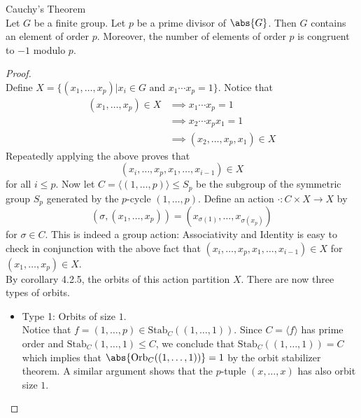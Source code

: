 \documentclass[a4paper]{article}
\begin{document}
\begin{thm}{Cauchy's Theorem}{}\\
Let $G$ be a finite group. Let $p$ be a prime divisor of $\abs{G}$. Then $G$ contains an element of order $p$. Moreover, the number of elements of order $p$ is congruent to $-1$ modulo $p$. 
\begin{proof}\\
Define $X=\{(x_1,\dots,x_p)|x_i\in G\text{ and }x_1\cdots x_p=1\}$. Notice that 
\begin{align*}
(x_1,\dots,x_p)\in X&\implies x_1\cdots x_p=1\\
&\implies x_2\cdots x_px_1=1\\
&\implies(x_2,\dots,x_p,x_1)\in X
\end{align*}
Repeatedly applying the above proves that $$(x_i,\dots,x_p,x_1,\dots,x_{i-1})\in X$$ for all $i\leq p$. Now let $C=\langle(1,\dots,p)\rangle\leq S_p$ be the subgroup of the symmetric group $S_p$ generated by the $p$-cycle $(1,\dots,p)$. Define an action $\cdot:C\times X\to X$ by $$(\sigma,(x_1,\dots,x_p))=(x_{\sigma(1)},\dots,x_{\sigma(x_p)})$$ for $\sigma\in C$. This is indeed a group action: Associativity and Identity is easy to check in conjunction with the above fact that $(x_i,\dots,x_p,x_1,\dots,x_{i-1})\in X$ for $(x_1,\dots,x_p)\in X$. \\

By corollary 4.2.5, the orbits of this action partition $X$. There are now three types of orbits. 
\begin{itemize}
\item Type 1: Orbits of size $1$. \\
Notice that $f=(1,\dots,p)\in\text{Stab}_C((1,\dots,1))$. Since $C=\langle f\rangle$ has prime order and $\text{Stab}_C(1,\dots,1)\leq C$, we conclude that $\text{Stab}_C((1,\dots,1))=C$ which implies that $\abs{\text{Orb}_C((1,\dots,1))}=1$ by the orbit stabilizer theorem. A similar argument shows that the $p$-tuple $(x,\dots,x)$ has also orbit size $1$. \\


\end{itemize}
\end{proof}
\end{thm}
\end{document}
